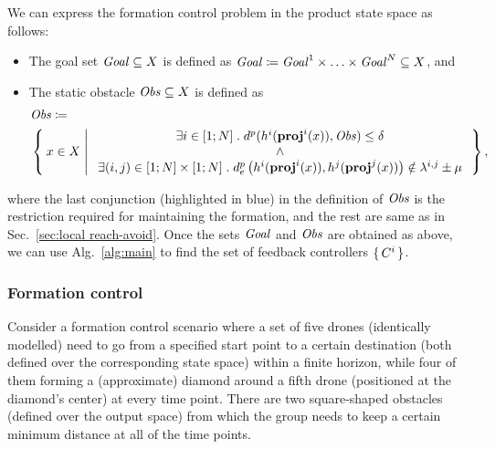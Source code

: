 We can express the formation control problem in the product state space as follows:
\begin{itemize}
	\item The goal set $\mathit{Goal}\subseteq X$ is defined as $\mathit{Goal} \coloneqq \mathit{Goal}^1\times \ldots \times \mathit{Goal}^N \subseteq X$, and
	\item The static obstacle $\mathit{Obs}\subseteq X$ is defined as 
		\begin{align}
			&\mathit{Obs} \coloneqq\\ 
				&\Set{ x\in X | 
					\begin{array}{c}
						\exists i\in [1;N]\;.\; d^{p}(h^i(\mathbf{proj}^i(x)),\mathit{Obs}) \leq \delta\\
						 \wedge\\
						  {\exists (i,j)\in [1;N]\times [1;N]\;.\; d^{p}_e\left(h^i(\mathbf{proj}^i(x)),h^j(\mathbf{proj}^j(x))\right)\notin\lambda^{i,j}\pm \mu}
					\end{array}},
		\end{align}
\end{itemize}
where the last conjunction (highlighted in blue) in the definition of $\mathit{Obs}$ is the restriction required for maintaining the formation, and the rest are same as in Sec.~\ref{sec:local reach-avoid}.
Once the sets $\mathit{Goal}$ and $\mathit{Obs}$ are obtained as above, we can use Alg.~\ref{alg:main} to find the set of feedback controllers $\set{C^i}$.

\subsubsection{Formation control}
\label{subsec:formation_control}
Consider a formation control scenario where a set of five drones (identically modelled) need to go from a specified start point to a certain destination (both defined over the corresponding state space) within a finite horizon, while four of them forming a (approximate) diamond around a fifth drone (positioned at the diamond's center) at every time point. There are two square-shaped obstacles (defined over the output space) from which the group needs to keep a certain minimum distance at all of the time points. %

